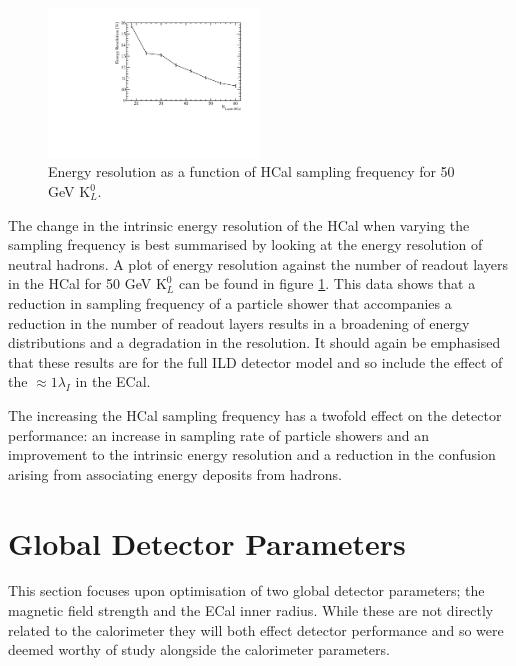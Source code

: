 \begin{figure}
\centering
\includegraphics[width=0.5\textwidth]{OptimisationStudies/Plots/EnergyResolution/ER_vs_HCalLayerNumber_50GeVKaon0L.pdf}
\caption[Energy resolution as a function of HCal sampling frequency for 50 GeV $\text{K}^{0}_{L}$.]{Energy resolution as a function of HCal sampling frequency for 50 GeV $\text{K}^{0}_{L}$.}
\label{fig:hcalnlayers}
\end{figure}

The change in the intrinsic energy resolution of the HCal when varying the sampling frequency is best summarised by looking at the energy resolution of neutral hadrons.  A plot of energy resolution against the number of readout layers in the HCal for 50 GeV $\text{K}^{0}_{L}$ can be found in figure \ref{fig:hcalnlayers}.  This data shows that a reduction in sampling frequency of a particle shower that accompanies a reduction in the number of readout layers results in a broadening of energy distributions and a degradation in the resolution.  It should again be emphasised that these results are for the full ILD detector model and so include the effect of the $\approx 1 \lambda_{I}$ in the ECal.  

The increasing the HCal sampling frequency has a twofold effect on the detector performance: an increase in sampling rate of particle showers and an improvement to the intrinsic energy resolution and a reduction in the confusion arising from associating energy deposits from hadrons.  


\section{Global Detector Parameters}
This section focuses upon optimisation of two global detector parameters; the magnetic field strength and the ECal inner radius.  While these are not directly related to the calorimeter they will both effect detector performance and so were deemed worthy of study alongside the calorimeter parameters. 

